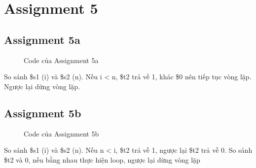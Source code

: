 \documentclass[a4paper,12pt]{article}
\begin{document}
\section{Assignment 5}
\subsection{Assignment 5a}
\begin{figure}[!h]
	\centerline{}
	\caption{Code của Assignment 5a}
	\label{fig:ass5a}
\end{figure}
\noindent
So sánh \$s1 (i) và \$s2 (n). Nếu i < n, \$t2 trả về 1, khác \$0 nên tiếp tục vòng lặp. Ngược lại dừng vòng lặp. \\ 
\clearpage
\newpage
\subsection{Assignment 5b}
\begin{figure}[!h]
	\centerline{}
	\caption{Code của Assignment 5b}
	\label{fig:ass5b}
\end{figure}
\noindent
So sánh \$s1 (i) và \$s2 (n). Nếu n < i, \$t2 trả về 1, ngược lại \$t2 trả về 0. So sánh \$t2 và 0, nếu bằng nhau thực hiện loop, ngược lại dừng vòng lặp
\clearpage
\newpage
\end{document}
